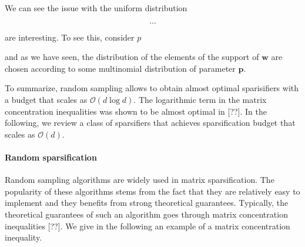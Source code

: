\documentclass[twoside,11pt]{book}
\numberwithin{theorem}{chapter}
\numberwithin{definition}{chapter}
\numberwithin{proposition}{chapter}
\numberwithin{corollary}{chapter}
\numberwithin{example}{chapter}
\numberwithin{lemma}{chapter}
\numberwithin{assumption}{chapter}
\DeclareMathOperator{\Tran}{\intercal}
\begin{document}
We can see the issue with the uniform distribution 

\begin{equation}
...
\end{equation}

are interesting. To see this, consider $p$

 and as we have seen, the distribution of the elements of the support of $\bm{w}$ are chosen according to some multinomial distribution of parameter $\bm{p}$.

To summarize, random sampling allows to obtain almost optimal sparisifiers with a budget that scales as $\mathcal{O}(d \log d)$. The logarithmic term in the matrix concentration inequalities was shown to be almost optimal in [??]. 
In the following, we review a class of sparsifiers that achieves sparsification budget that scales as $\mathcal{O}(d)$.









\paragraph{Random sparsification}
Random sampling algorithms are widely used in matrix sparsification. The popularity of these algorithms stems from the fact that they are relatively easy to implement and they benefits from strong theoretical guarantees.  Typically, the theoretical guarantees of such an algorithm goes through matrix concentration inequalities [??]. We give in the following an example of a matrix concentration inequality. 
\end{document}
